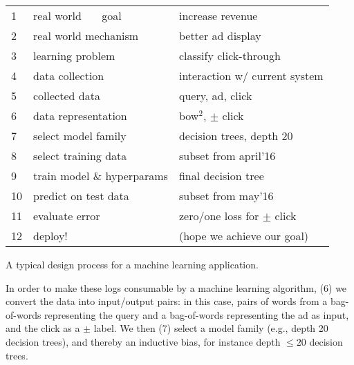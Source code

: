 {
  \begin{marginfigure}[\NextFigureOffset]
    \begin{centering}
      \tabulinestyle{1pt}
      \everyrow{\hline}
      \renewcommand{\arraystretch}{1.5}
      \tabulinesep=2pt
      \begin{tabu}{|@{ }m{4mm}@{~~ }y@{~~~~}|@{}z|}
        1 & real world ~~~goal     & increase revenue        \\
        2 & real world mechanism& better ad display       \\
        3 & learning problem    & classify click-through  \\
        4 & data collection     & interaction w/ current system\\
        5 & collected data      & query, ad, click        \\
        6 & data representation & bow$^2$, $\pm$ click    \\
        7 & select model family   & decision trees, depth 20      \\
        8 & select training data   & subset from april'16    \\
        9 & train model \& hyperparams   & final decision tree     \\
       10 & predict on test data& subset from may'16      \\
       11 & evaluate error      & zero/one loss for $\pm$ click     \\
       12 & deploy! & (hope we achieve our goal)\\
      \end{tabu}
      \caption{A typical design process for a machine learning application.}
    \label{fig:formal_deployml}
    \end{centering}
  \end{marginfigure}
  \ResetNextFigure{}
}

In order to make these logs consumable by a machine learning algorithm, (6) we convert the data into input/output pairs: in this case, pairs of words from a bag-of-words representing the query and a bag-of-words representing the ad as input, and the click as a $\pm$ label. We then (7) select a model family (e.g., depth 20 decision trees), and thereby an inductive bias, for instance depth $\leq 20$ decision trees.

